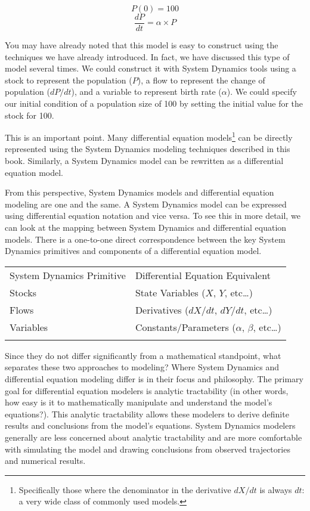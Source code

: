 \documentclass[]{memoir}
\begin{document}
\[ P(0) = 100 \] \[ \frac{dP}{dt} = \alpha \times P \]

You may have already noted that this model is easy to construct using
the techniques we have already introduced. In fact, we have discussed
this type of model several times. We could construct it with System
Dynamics tools using a stock to represent the population ($P$), a flow
to represent the change of population ($dP/dt$), and a variable to
represent birth rate ($\alpha$). We could specify our initial condition
of a population size of 100 by setting the initial value for the stock
for 100.

This is an important point. Many differential equation models\footnote{Specifically
  those where the denominator in the derivative $dX/dt$ is always $dt$:
  a very wide class of commonly used models.} can be directly
represented using the System Dynamics modeling techniques described in
this book. Similarly, a System Dynamics model can be rewritten as a
differential equation model.

From this perspective, System Dynamics models and differential equation
modeling are one and the same. A System Dynamics model can be expressed
using differential equation notation and vice versa. To see this in more
detail, we can look at the mapping between System Dynamics and
differential equation models. There is a one-to-one direct
correspondence between the key System Dynamics primitives and components
of a differential equation model.

\begin{longtable}[c]{@{}ll@{}}
\hline\noalign{\medskip}
System Dynamics Primitive & Differential Equation Equivalent
\\\noalign{\medskip}
\hline\noalign{\medskip}
Stocks & State Variables ($X$, $Y$, etc\ldots{})
\\\noalign{\medskip}
Flows & Derivatives ($dX/dt$, $dY/dt$, etc\ldots{})
\\\noalign{\medskip}
Variables & Constants/Parameters ($\alpha$, $\beta$, etc\ldots{})
\\\noalign{\medskip}
\hline
\end{longtable}

Since they do not differ significantly from a mathematical standpoint,
what separates these two approaches to modeling? Where System Dynamics
and differential equation modeling differ is in their focus and
philosophy. The primary goal for differential equation modelers is
analytic tractability (in other words, how easy is it to mathematically
manipulate and understand the model's equations?). This analytic
tractability allows these modelers to derive definite results and
conclusions from the model's equations. System Dynamics modelers
generally are less concerned about analytic tractability and are more
comfortable with simulating the model and drawing conclusions from
observed trajectories and numerical results.
\end{document}

